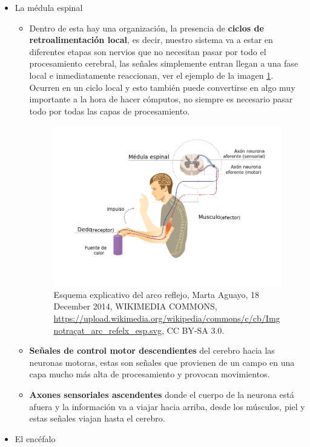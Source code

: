 \begin{itemize}
 \item La médula espinal
    \begin{itemize}
     \item Dentro de esta hay una organización, la presencia de \textbf{ciclos de retroalimentación local}, es decir, nuestro sistema va a estar en diferentes etapas son nervios que no necesitan pasar por todo el procesamiento cerebral, las señales simplemente entran llegan a una fase local e inmediatamente reaccionan, ver el ejemplo de la imagen \ref{actReflejo}. Ocurren en un ciclo local y esto también puede convertirse en algo muy importante a la hora de hacer cómputos, no siempre es necesario pasar todo por todas las capas de procesamiento. 

     \begin{figure}[h]
      \centering
      \includegraphics[scale=0.4]{../Figuras/actReflejo.png}
      \caption{ Esquema explicativo del arco reflejo, Marta Aguayo, 18 December 2014, WIKIMEDIA COMMONS, \url{https://upload.wikimedia.org/wikipedia/commons/c/cb/Imgnotraçat_arc_refelx_esp.svg}, CC BY-SA 3.0.}
      \label{actReflejo}
     \end{figure}

     \item \textbf{Señales de control motor descendientes} del cerebro hacia las neuronas motoras, estas son señales que provienen de un campo en una capa mucho más alta de procesamiento y provocan movimientos.
     
     \item \textbf{Axones sensoriales ascendentes} donde el cuerpo de la neurona está afuera y la información va a viajar hacia arriba, desde los músculos, piel y  estas señales viajan hasta el cerebro.  

     \end{itemize}

 \item El encéfalo
\end{itemize}

